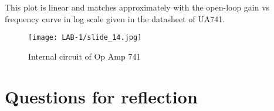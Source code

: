 \documentclass[12pt]{article}
\begin{document}
         This plot is linear and matches approximately with the open-loop gain vs frequency curve in log scale given in the datasheet of UA741.
        \begin{figure}[H]
            \centering
            \texttt{[image: LAB-1/slide\_14.jpg]}
            \caption{Internal circuit of Op Amp 741}
        \end{figure}
        
        \newpage
    

    \section{Questions for reflection}  
    
\end{document}
